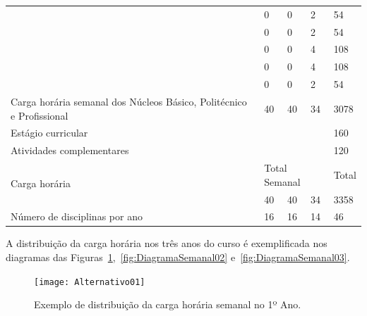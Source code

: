 \documentclass[11pt,fleqn]{book} %
\begin{document}
\begin{table}[H]
{\begin{tabular}{|l|l|l|l|l|l|}
			& \nameref{disc:biotecAlimentos}                                               & 0          & 0         & 2         & 54        \\ \cline{2-6} 
			& \nameref{disc:biotecSaude}                                                   & 0          & 0         & 2         & 54        \\ \cline{2-6} 
			& \nameref{disc:microbiologia}                                                 & 0          & 0         & 4         & 108       \\ \cline{2-6}
			& \nameref{disc:producao}                                                      & 0          & 0         & 4         & 108       \\ \cline{2-6} 
			& \nameref{disc:fermentacao}                                                   & 0          & 0         & 2         & 54        \\ \hline			
			\multicolumn{2}{|l|}{Carga horária semanal dos Núcleos Básico, Politécnico e Profissional} %
			                                                                               & 40         & 40        & 34        & 3078      \\ \hline
			\multicolumn{5}{|l|}{Estágio curricular}                                                                            & 160       \\ \hline
			\multicolumn{5}{|l|}{Atividades complementares}                                                                     & 120       \\ \hline
			\multicolumn{2}{|l|}{\multirow{2}{*}{Carga horária}}                           & \multicolumn{3}{l|}{Total Semanal} & Total     \\ \cline{3-6} 
			\multicolumn{2}{|l|}{}                                                         & 40         & 40        & 34        & 3358      \\ \hline
			\multicolumn{2}{|l|}{Número de disciplinas por ano}                            & 16         & 16        & 14        & 46        \\ \hline
		\end{tabular}%
	}
\end{table}

A distribuição da carga horária nos três anos do curso é exemplificada nos diagramas das Figuras~\ref{fig:DiagramaSemanal01},~\ref{fig:DiagramaSemanal02} e~\ref{fig:DiagramaSemanal03}.

\begin{figure}[!htp]
	\centering
	\texttt{[image: Alternativo01]}
	\caption{Exemplo de distribuição da carga horária semanal no 1º Ano.}
	\label{fig:DiagramaSemanal01}
\end{figure}
\end{document}
